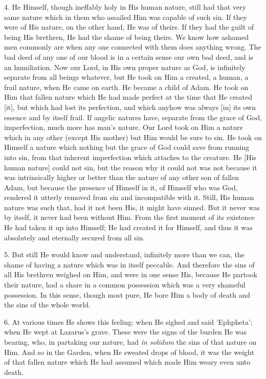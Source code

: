 4. He Himself, though ineffably holy in His human
nature, still had that very same nature which in them who assailed Him
was capable of such sin. If they were of His nature, on the other
hand, He was of theirs. If they had the guilt of being His brethren,
He had the shame of being theirs. We know how ashamed men commonly are
when any one connected with them does anything wrong. The bad deed of
any one of our blood is in a certain sense our own bad deed, and is an
humiliation. Now our Lord, in His own proper nature as God, is
infinitely separate from all beings whatever, but He took on Him
a created, a human, a frail nature, when He came on earth. He became a
child of Adam. He took on Him that fallen nature which He had made
perfect at the time that He created [it], but which had lost its
perfection, and which anyhow was always [in] its own essence and by
itself frail. If angelic natures have, separate from the grace of God,
imperfection, much more has man's nature. Our Lord took on Him a
nature which in any other (except His mother) but Him would be sure to
sin. He took on Himself a nature which nothing but the grace of God
could save from running into sin, from that inherent imperfection
which attaches to the creature. He [His human nature] could not sin,
but the reason why it could not was not because it was intrinsically
higher or better than the nature of any other son of fallen Adam, but
because the presence of Himself in it, of Himself who was God,
rendered it utterly removed from sin and incompatible with it. Still,
His human nature was such that, had it not been His, it might have
sinned. But it never was by itself, it never had been without Him.
From the first moment of its existence He had taken it up into
Himself; He had created it for Himself, and thus it was absolutely and
eternally secured from all sin.

5. But still He would know and understand,
infinitely more than we can, the shame of having a nature which was in
itself peccable. And therefore the sins of all His brethren weighed on
Him, and were in one sense His, because He partook their nature, had a
share in a common possession which was a very shameful possession. In
this sense, though most pure, He bore Him a body of death and
the sins of the whole world.

6. At various times He shows this feeling: when
He sighed and said 'Ephpheta'; when He wept at Lazarus's grave. These
were the signs of the burden He was bearing, who, in partaking our
nature, had \emph{in solidum} the sins of that nature on Him. And so
in the Garden, when He sweated drops of blood, it was the weight of
that fallen nature which He had assumed which made Him weary even unto
death.

